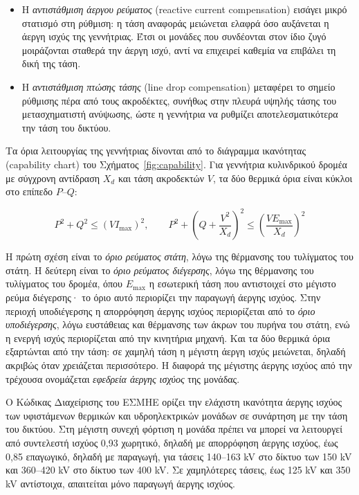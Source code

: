 \begin{itemize}
\item Η \emph{αντιστάθμιση άεργου ρεύματος} (reactive current compensation) εισάγει μικρό
      στατισμό στη ρύθμιση: η τάση αναφοράς μειώνεται ελαφρά όσο αυξάνεται η άεργη ισχύς της
      γεννήτριας. Έτσι οι μονάδες που συνδέονται στον ίδιο ζυγό μοιράζονται σταθερά την άεργη
      ισχύ, αντί να επιχειρεί καθεμία να επιβάλει τη δική της τάση.
\item Η \emph{αντιστάθμιση πτώσης τάσης} (line drop compensation) μεταφέρει το σημείο
      ρύθμισης πέρα από τους ακροδέκτες, συνήθως στην πλευρά υψηλής τάσης του μετασχηματιστή
      ανύψωσης, ώστε η γεννήτρια να ρυθμίζει αποτελεσματικότερα την τάση του δικτύου.
\end{itemize}

Τα όρια λειτουργίας της γεννήτριας δίνονται από το διάγραμμα ικανότητας (capability chart)
του Σχήματος~\ref{fig:capability}. Για γεννήτρια κυλινδρικού δρομέα με σύγχρονη αντίδραση
$X_d$ και τάση ακροδεκτών $V$, τα δύο θερμικά όρια είναι κύκλοι στο επίπεδο $P$--$Q$:

\begin{equation}
P^2 + Q^2 \le \left(V I_{\max}\right)^2, \qquad
P^2 + \left(Q + \frac{V^2}{X_d}\right)^2 \le \left(\frac{V E_{\max}}{X_d}\right)^2
\label{eq:capability}
\end{equation}

Η πρώτη σχέση είναι το \emph{όριο ρεύματος στάτη}, λόγω της θέρμανσης του τυλίγματος του
στάτη. Η δεύτερη είναι το \emph{όριο ρεύματος διέγερσης}, λόγω της θέρμανσης του τυλίγματος
του δρομέα, όπου $E_{\max}$ η εσωτερική τάση που αντιστοιχεί στο μέγιστο ρεύμα διέγερσης· το
όριο αυτό περιορίζει την παραγωγή άεργης ισχύος. Στην περιοχή υποδιέγερσης η απορρόφηση άεργης
ισχύος περιορίζεται από το \emph{όριο υποδιέγερσης}, λόγω ευστάθειας και θέρμανσης των άκρων
του πυρήνα του στάτη, ενώ η ενεργή ισχύς περιορίζεται από την κινητήρια μηχανή. Και τα δύο
θερμικά όρια εξαρτώνται από την τάση: σε χαμηλή τάση η μέγιστη άεργη ισχύς μειώνεται, δηλαδή
ακριβώς όταν χρειάζεται περισσότερο. Η διαφορά της μέγιστης άεργης ισχύος από την τρέχουσα
ονομάζεται \emph{εφεδρεία άεργης ισχύος} της μονάδας.

Ο Κώδικας Διαχείρισης του ΕΣΜΗΕ ορίζει την ελάχιστη ικανότητα άεργης ισχύος των υφιστάμενων
θερμικών και υδροηλεκτρικών μονάδων σε συνάρτηση με την τάση του δικτύου. Στη μέγιστη συνεχή
φόρτιση η μονάδα πρέπει να μπορεί να λειτουργεί από συντελεστή ισχύος 0,93 χωρητικό, δηλαδή με
απορρόφηση άεργης ισχύος, έως 0,85 επαγωγικό, δηλαδή με παραγωγή, για τάσεις 140--163 kV στο
δίκτυο των 150 kV και 360--420 kV στο δίκτυο των 400 kV. Σε χαμηλότερες τάσεις, έως 125 kV και
350 kV αντίστοιχα, απαιτείται μόνο παραγωγή άεργης ισχύος.

